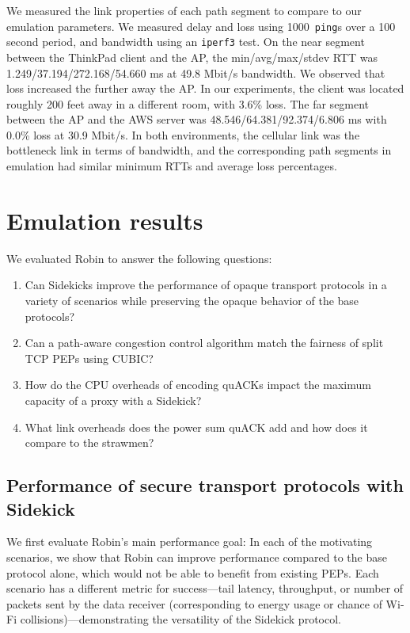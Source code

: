 We measured the link properties of each path segment to compare to
our emulation parameters. We measured delay and loss using 1000~\texttt{ping}s
over a 100 second period, and bandwidth using an \texttt{iperf3} test.
On the near segment between the ThinkPad client and the AP,
the min/avg/max/stdev RTT was 1.249/37.194/272.168/54.660 ms
at 49.8 Mbit/s bandwidth. We observed that loss increased
the further away the AP. In our experiments, the client was located roughly
200 feet away in a different room, with 3.6\% loss.
The far segment between the AP and the AWS server was
48.546/64.381/92.374/6.806 ms with 0.0\% loss at 30.9 Mbit/s.
In both environments, the cellular link was the bottleneck link in terms of
bandwidth, and the corresponding path segments in emulation had similar
minimum RTTs and average loss percentages.

\section{Emulation results}
\label{sec:sidekick:evaluation}




We evaluated Robin to answer the following questions:
\begin{enumerate}[noitemsep,topsep=0pt]
	\item Can Sidekicks improve the performance of opaque transport protocols
	in a variety of scenarios while preserving the opaque behavior of the
	base protocols?
	\item Can a path-aware congestion control algorithm match the fairness of
	split TCP PEPs using CUBIC?
	\item How do the CPU overheads of encoding quACKs impact the maximum
	capacity of a proxy with a Sidekick?
	\item What link overheads does the power sum quACK add and how does it
	compare to the strawmen?
\end{enumerate}

\subsection{Performance of secure transport protocols with Sidekick}
\label{sec:sidekick:evaluation:main-results}

We first evaluate Robin's main performance goal: In each of the motivating
scenarios, we show that Robin can improve performance compared to the base
protocol alone, which would not be able to benefit from existing PEPs.
Each scenario has a different metric for success---tail latency, throughput,
or number of packets sent by the data receiver (corresponding to energy usage
or chance of Wi-Fi collisions)---demonstrating the versatility of the Sidekick
protocol.

